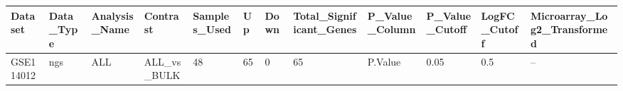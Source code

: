 \begingroup
\tiny
\setlength{\tabcolsep}{2pt}
\renewcommand{\arraystretch}{1.18}
\begin{tabular}{@{}llllllllllll@{}}
\toprule
Dataset & Data\_Type & Analysis\_Name & Contrast & Samples\_Used & Up & Down & Total\_Significant\_Genes & P\_Value\_Column & P\_Value\_Cutoff & LogFC\_Cutoff & Microarray\_Log2\_Transformed \\
\midrule
GSE114012 & ngs & ALL & ALL\_vs\_BULK & 48 & 65 & 0 & 65 & P.Value & 0.05 & 0.5 & -- \\
\bottomrule
\end{tabular}
\endgroup
